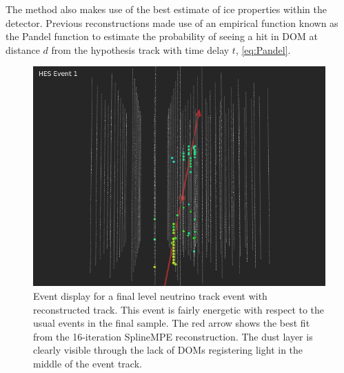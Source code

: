 \documentclass{gatech-thesis}
\begin{document}
The method also makes use of the best estimate of ice properties within the detector. Previous reconstructions made use of an empirical function known as the Pandel function to estimate the probability of seeing a hit in DOM at distance $d$ from the hypothesis track with time delay $t$, \ref{eq:Pandel}.

\begin{figure}[ht]
  \begin{center}
    \includegraphics[width=1.0\textwidth,keepaspectratio]{HES_Upgoing_WithReco.png}
  \end{center}
  \caption{Event display for a final level neutrino track event with reconstructed track. This event is fairly energetic with respect to the usual events in the final sample. The red arrow shows the best fit from the 16-iteration SplineMPE reconstruction. The dust layer is clearly visible through the lack of DOMs registering light in the middle of the event track.}
  \label{fig:HESEventWithReco}
\end{figure}
\end{document}
